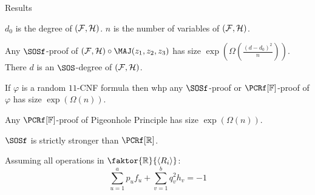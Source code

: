\begin{frame}{Results}

    $d_0$ is the degree of $(\mathcal{F}, \mathcal{H})$. $n$ is the number of variables of $(\mathcal{F}, \mathcal{H})$.
    
    \begin{theorem}
        Any $\SOSf$-proof of $(\Fs, \Hs) \circ \MAJ(z_1, z_2, z_3)$ has size
        $\exp(\Omega(\frac{(d - d_0)^2}{n}))$. There $d$ is an $\SOS$-degree of $(\mathcal{F}, \mathcal{H})$.
    \end{theorem}

    \pause

    \begin{theorem}
        If $\varphi$ is a random $11$-CNF formula then whp any $\SOSf$-proof or $\PCRf[\field]$-proof of
        $\varphi$ has size $\exp(\Omega(n))$.
    \end{theorem}

    \pause
    \begin{theorem}
        Any $\PCRf[\field]$-proof of Pigeonhole Principle has size $\exp(\Omega(n))$.
    \end{theorem}

    $\SOSf$ is strictly stronger than $\PCRf[\mathbb{R}]$.

\end{frame}


\begin{frame}
        Assuming all operations in $\faktor{\mathbb{R}}{\langle R_i \rangle}$:
    $$
        \sum_{u = 1}^{a} p_u f_u + \sum_{v = 1}^{b} q_v^2 h_v = -1
    $$
        
    \vspace{1cm}

\end{frame}